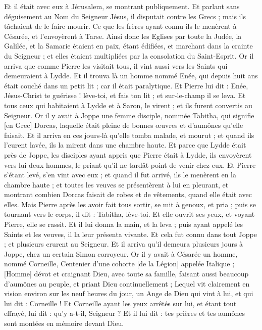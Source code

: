 \begin{multicols}{2}
Et il était avec eux à Jérusalem, se montrant publiquement.
Et parlant sans déguisement au Nom du Seigneur Jésus, il disputait contre les Grecs ; mais ils tâchaient de le faire mourir.
Ce que les frères ayant connu ils le menèrent à Césarée, et l'envoyèrent à Tarse.
Ainsi donc les Eglises par toute la Judée, la Galilée, et la Samarie étaient en paix, étant édifiées, et marchant dans la crainte du Seigneur ; et elles étaient multipliées par la consolation du Saint-Esprit.
Or il arriva que comme Pierre les visitait tous, il vint aussi vers les Saints qui demeuraient à Lydde.
Et il trouva là un homme nommé Enée, qui depuis huit ans était couché dans un petit lit ; car il était paralytique.
Et Pierre lui dit : Enée, Jésus-Christ te guérisse ! lève-toi, et fais ton lit ; et sur-le-champ il se leva.
Et tous ceux qui habitaient à Lydde et à Saron, le virent ; et ils furent convertis au Seigneur.
Or il y avait à Joppe une femme disciple, nommée Tabitha, qui signifie [en Grec] Dorcas, laquelle était pleine de bonnes œuvres et d'aumônes qu'elle faisait.
Et il arriva en ces jours-là qu'elle tomba malade, et mourut ; et quand ils l'eurent lavée, ils la mirent dans une chambre haute.
Et parce que Lydde était près de Joppe, les disciples ayant appris que Pierre était à Lydde, ils envoyèrent vers lui deux hommes, le priant qu'il ne tardât point de venir chez eux.
Et Pierre s'étant levé, s'en vint avec eux ; et quand il fut arrivé, ils le menèrent en la chambre haute ; et toutes les veuves se présentèrent à lui en pleurant, et montrant combien Dorcas faisait de robes et de vêtements, quand elle était avec elles.
Mais Pierre après les avoir fait tous sortir, se mit à genoux, et pria ; puis se tournant vers le corps, il dit : Tabitha, lève-toi. Et elle ouvrit ses yeux, et voyant Pierre, elle se rassit.
Et il lui donna la main, et la leva ; puis ayant appelé les Saints et les veuves, il la leur présenta vivante.
Et cela fut connu dans tout Joppe ; et plusieurs crurent au Seigneur.
Et il arriva qu'il demeura plusieurs jours à Joppe, chez un certain Simon corroyeur.
\VerseOne{}Or il y avait à Césarée un homme, nommé Corneille, Centenier d'une cohorte [de la Légion] appelée Italique ;
[Homme] dévot et craignant Dieu, avec toute sa famille, faisant aussi beaucoup d'aumônes au peuple, et priant Dieu continuellement ;
Lequel vit clairement en vision environ sur les neuf heures du jour, un Ange de Dieu qui vint à lui, et qui lui dit : Corneille !
Et Corneille ayant les yeux arrêtés sur lui, et étant tout effrayé, lui dit : qu'y a-t-il, Seigneur ? Et il lui dit : tes prières et tes aumônes sont montées en mémoire devant Dieu.

\end{multicols}
